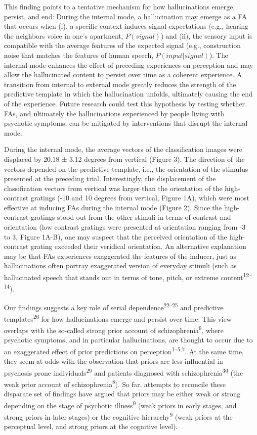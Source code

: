 \documentclass[
]{article}
\begin{document}
This finding points to a tentative mechanism for how hallucinations
emerge, persist, and end: During the internal mode, a hallucination may
emerge as a FA that occurs when (i), a specific context induces signal
expectations (e.g., hearing the neighbors voice in one's apartment,
\(P(signal)\)) and (ii), the sensory input is compatible with the
average features of the expected signal (e.g., construction noise that
matches the features of human speech, \(P(input|signal)\)). The internal
mode enhances the effect of preceding experiences on perception and may
allow the hallucinated content to persist over time as a coherent
experience. A transition from internal to external mode greatly reduces
the strength of the predictive template in which the hallucination
unfolds, ultimately causing the end of the experience. Future research
could test this hypothesis by testing whether FAs, and ultimately the
hallucinations experienced by people living with psychotic symptoms, can
be mitigated by interventions that disrupt the internal mode.

During the internal mode, the average vectors of the classification
images were displaced by \(20.18\) ± \(3.12\) degrees from vertical
(Figure 3). The direction of the vectors depended on the predictive
template, i.e., the orientation of the stimulus presented at the
preceding trial. Interestingly, the displacement of the classification
vectors from vertical was larger than the orientation of the
high-contrast gratings (-10 and 10 degrees from vertical, Figure 1A),
which were most effective at inducing FAs during the internal mode
(Figure 2). Since the high-contrast gratings stood out from the other
stimuli in terms of contrast and orientation (low contrast gratings were
presented at orientation ranging from -3 to 3, Figure 1A-B), one may
suspect that the perceived orientation of the high-contrast grating
exceeded their veridical orientation. An alternative explanation may be
that FAs experiences exaggerated the features of the inducer, just as
hallucinations often portray exaggerated version of everyday stimuli
(such as hallucinated speech that stands out in terms of tone, pitch, or
extreme content\textsuperscript{12--14}).

Our findings suggests a key role of serial
dependence\textsuperscript{22--25} and predictive
templates\textsuperscript{26} for how hallucinations emerge and persist
over time. This view overlaps with the so-called strong prior account of
schizophrenia\textsuperscript{9}, where psychotic symptoms, and in
particular hallucinations, are thought to occur due to an exaggerated
effect of prior predictions on perception\textsuperscript{1--5,7}. At
the same time, they seem at odds with the observation that priors are
less influential in psychosis prone individuals\textsuperscript{29} and
patients diagnosed with schizophrenia\textsuperscript{30} (the weak
prior account of schizophrenia\textsuperscript{8}). So far, attempts to
reconcile these disparate set of findings have argued that priors may be
either weak or strong depending on the stage of psychotic
illness\textsuperscript{9} (weak priors in early stages, and strong
priors in later stages) or the cognitive hierarchy\textsuperscript{9}
(weak priors at the perceptual level, and strong priors at the cognitive
level).
\end{document}
